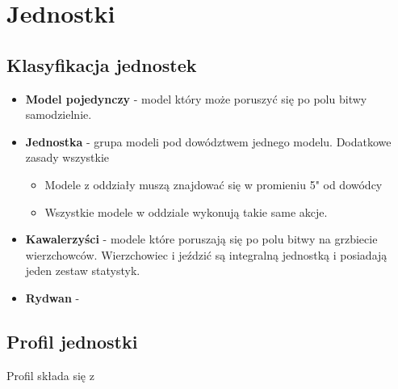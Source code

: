 \chapter{Jednostki}

\section{Klasyfikacja jednostek}
\begin{itemize}
    \item \textbf{Model pojedynczy}  \label{sec:link_jednostki_model_pojedynczy} - model który może poruszyć się po polu bitwy samodzielnie.
    \item \textbf{Jednostka}  \label{sec:link_jednostki_jednostka} - grupa modeli pod dowództwem jednego modelu.
    Dodatkowe zasady wszystkie
    \begin{itemize}
        \item Modele z oddziały muszą znajdować się w promieniu 5" od dowódcy
        \item Wszystkie modele w oddziale wykonują takie same akcje.
    \end{itemize}
    \item \textbf{Kawalerzyści}  \label{sec:link_jednostki_Kawalerzysci}  - modele które poruszają się po polu bitwy na grzbiecie wierzchowców. Wierzchowiec i jeździć są integralną jednostką i posiadają jeden zestaw statystyk.
    \item \textbf{Rydwan}  \label{sec:link_jednostki_Rydwan} - 
\end{itemize}

\section{Profil jednostki}
Profil składa się z

